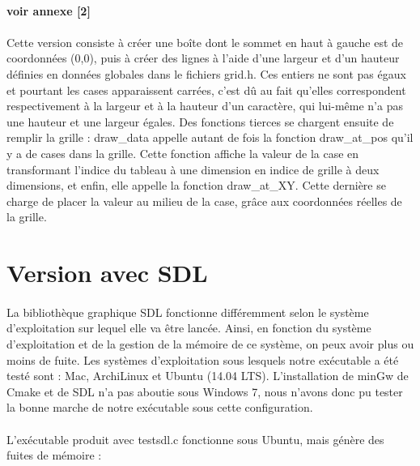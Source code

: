 \documentclass{report}
\begin{document}
\paragraph{voir annexe [2]}

\paragraph{}Cette version consiste à créer une boîte dont le sommet en haut à gauche est de coordonnées (0,0), puis à créer des lignes à l'aide d'une largeur et d'un hauteur définies en données globales dans le fichiers grid.h. Ces entiers ne sont pas égaux et pourtant les cases apparaissent carrées, c'est dû au fait qu'elles correspondent respectivement à la largeur et à la hauteur d'un caractère, qui lui-même n'a pas une hauteur et une largeur égales.
Des fonctions tierces se chargent ensuite de remplir la grille : draw{\_}data appelle autant de fois la fonction draw{\_}at{\_}pos qu'il y a de cases dans la grille. Cette fonction affiche la valeur de la case en transformant l'indice du tableau à une dimension en indice de grille à deux dimensions, et enfin, elle appelle la fonction draw{\_}at{\_}XY. Cette dernière se charge de placer la valeur au milieu de la case, grâce aux coordonnées réelles de la grille.

\section{Version avec SDL}

\paragraph{}

La bibliothèque graphique SDL fonctionne différemment selon le système d'exploitation sur lequel elle va être lancée. Ainsi, en fonction du système d'exploitation et de la gestion de la mémoire de ce système, on peux avoir plus ou moins de fuite. Les systèmes d'exploitation sous lesquels notre exécutable a été testé sont : Mac, ArchiLinux et Ubuntu (14.04 LTS). L'installation de minGw de Cmake et de SDL n'a pas aboutie sous Windows 7, nous n'avons donc pu tester la bonne marche de notre exécutable sous cette configuration.

\paragraph{} L'exécutable produit avec testsdl.c fonctionne sous Ubuntu, mais génère des fuites de mémoire : 
\end{document}
